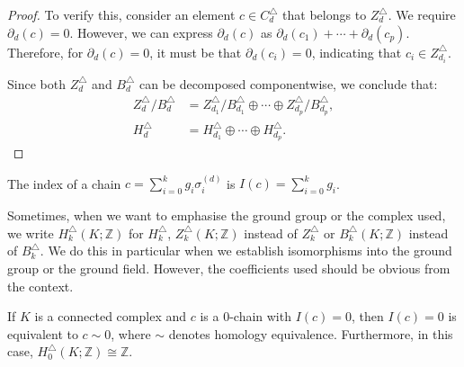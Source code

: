 \begin{proof}
	To verify this, consider an element \( c \in C^{\triangle}_{d} \) that belongs to \( Z^{\triangle}_{d} \). We require \( \partial_{d}(c) = 0 \). However, we can express \( \partial_{d}(c) \) as \( \partial_{d}(c_{1}) + \cdots + \partial_{d}(c_{p}) \). Therefore, for \( \partial_{d}(c) = 0 \), it must be that \( \partial_{d}(c_{i}) = 0 \), indicating that \( c_{i} \in Z^{\triangle}_{d_i} \).
				
	Since both \( Z^{\triangle}_{d} \) and \( B^{\triangle}_{d} \) can be decomposed componentwise, we conclude that:
	\begin{align}
		Z^{\triangle}_{d} / B^{\triangle}_{d} &= Z^{\triangle}_{d_1} / B^{\triangle}_{d_1} \oplus \cdots \oplus Z^{\triangle}_{d_p} / B^{\triangle}_{d_p}, \\
		H^{\triangle}_{d} &= H^{\triangle}_{d_1} \oplus \cdots \oplus H^{\triangle}_{d_p}. 
	\end{align}
\end{proof}

\begin{definition}[Index]
The index of a chain $c = \sum_{i=0}^{k} g_i \sigma_i^{(d)}$ is $I(c) = \sum_{i=0}^kg_i$.
\end{definition}

\begin{remark}
Sometimes, when we want to emphasise the ground group or the complex used, we write $H^\triangle_k(K;\mathbb{Z})$ for $H^\triangle_k$, $Z^\triangle_k(K;\mathbb{Z})$ instead of $Z^\triangle_k$ or $B^\triangle_k(K;\mathbb{Z})$ instead of $B^\triangle_k$. We do this in particular when we establish isomorphisms into the ground group or the ground field. However, the coefficients used should be obvious from the context.
\end{remark}

\begin{proposition}{\cite[Proposition 2.7]{hatcher2005algebraic}}
	\label{decomp}
	If \( K \) is a connected complex and \( c \) is a \( 0 \)-chain with \( I(c) = 0 \), then \( I(c) = 0 \) is equivalent to \( c \sim 0 \), where \( \sim \) denotes homology equivalence. Furthermore, in this case, \( H^{\triangle}_{0}(K; \mathbb{Z}) \cong \mathbb{Z} \).
\end{proposition}

